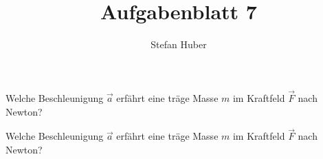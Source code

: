 \documentclass[ngerman]{exsheet2}
\title{Aufgabenblatt 7}
\author{Stefan Huber}
\institute{Department IT}
\begin{document}
\maketitle

\setcounter{exsheet2@excounter}{12}

\begin{exercise}
  Welche Beschleunigung $\vec{a}$ erfährt eine träge Masse $m$ im Kraftfeld
  $\vec{F}$ nach Newton?
  \vspace{2cm}
\end{exercise}

\begin{exercise}
  Welche Beschleunigung $\vec{a}$ erfährt eine träge Masse $m$ im Kraftfeld
  $\vec{F}$ nach Newton?
  \vspace{2cm}
\end{exercise}
\end{document}
